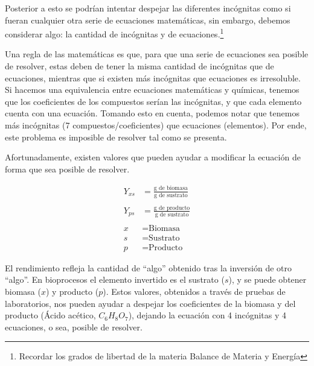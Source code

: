 Posterior a esto se podrían intentar despejar las diferentes incógnitas como si fueran cualquier otra serie de ecuaciones matemáticas, sin embargo, debemos considerar algo: la cantidad de incógnitas y de ecuaciones.\footnote{Recordar los grados de libertad de la materia Balance de Materia y Energía}

Una regla de las matemáticas es que, para que una serie de ecuaciones sea posible de resolver, estas deben de tener la misma cantidad de incógnitas que de ecuaciones, mientras que si existen más incógnitas que ecuaciones es irresoluble. Si hacemos una equivalencia entre ecuaciones matemáticas y químicas, tenemos que los coeficientes de los compuestos serían las incógnitas, y que cada elemento cuenta con una ecuación. Tomando esto en cuenta, podemos notar que tenemos más incógnitas (7 compuestos/coeficientes) que ecuaciones (elementos). Por ende, este problema es imposible de resolver tal como se presenta.

Afortunadamente, existen valores que pueden ayudar a modificar la ecuación de forma que sea posible de resolver.

\begin{align*}
    Y_{xs} &= \frac{\text{g de biomasa}}{\text{g de sustrato}}
    \\
    \\
    Y_{ps} &= \frac{\text{g de producto}}{\text{g de sustrato}}
    \\
    \\
    x &= \text{Biomasa}
    \\
    s &= \text{Sustrato}
    \\
    p &= \text{Producto}
\end{align*}

El rendimiento refleja la cantidad de ``algo'' obtenido tras la inversión de otro ``algo''. En bioprocesos el elemento invertido es el sustrato ($s$), y se puede obtener biomasa ($x$) y producto ($p$).
Estos valores, obtenidos a través de pruebas de laboratorios, nos pueden ayudar a despejar los coeficientes de la biomasa y del producto (Ácido acético, $C_{6}H_{8}O_{7}$), dejando la ecuación con 4 incógnitas y 4 ecuaciones, o sea, posible de resolver.

